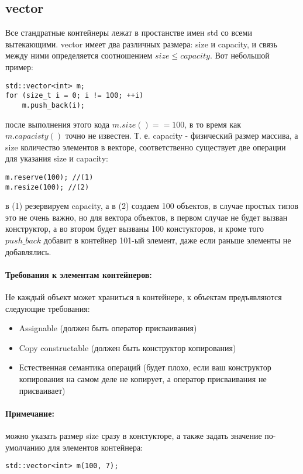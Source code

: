 \subsection{vector}

Все стандратные контейнеры лежат в простанстве имен std со всеми вытекающими. vector имеет два различных размера: size и capacity, и связь между ними определяется
соотношением $size \le capacity$. Вот небольшой пример:
\begin{lstlisting}
std::vector<int> m;
for (size_t i = 0; i != 100; ++i)
	m.push_back(i);
\end{lstlisting}
после выполнения этого кода $m.size() == 100$, в то время как $m.capacisty()$ точно не известен. Т. е. capacity - физический размер массива, а size количество
элементов в векторе, соответственно существует две операции для указания size и capacity:
\begin{lstlisting}
m.reserve(100); //(1)
m.resize(100); //(2)
\end{lstlisting}
в (1) резервируем capacity, а в (2) создаем 100 объектов, в случае простых типов это не очень важно, но для вектора объектов, в первом случае не будет вызван
конструктор, а во втором будет вызваны 100 констукторов, и кроме того $push\_back$ добавит в контейнер 101-ый элемент, даже если раньше элементы не добавлялись.

\paragraph{Требования к элементам контейнеров:} Не каждый объект может храниться в контейнере, к объектам предъявляются следующие требования:
\begin{itemize}
\item Assignable (должен быть оператор присваивания)

\item Copy constructable (должен быть конструктор копирования)

\item Естественная семантика операций (будет плохо, если ваш конструктор копирования на самом деле не копирует, а оператор присваивания не присваивает)
\end{itemize}

\paragraph{Примечание:} можно указать размер size сразу в констукторе, а также задать значение по-умолчанию для элементов контейнера:
\begin{lstlisting}
std::vector<int> m(100, 7);
\end{lstlisting}


